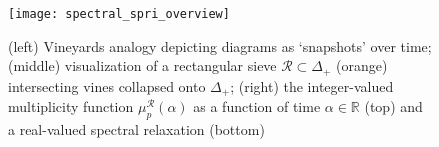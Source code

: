 \documentclass[10pt]{article}
\numberwithin{equation}{section}
\newcommand{\+}{%
	\raisebox{0.18ex}{\scaleobj{0.55}{+}}
}
\theoremstyle{definition}
\theoremstyle{definition}
\begin{document}
\noindent 


\begin{figure}\label{fig:overview}
\centering
\texttt{[image: spectral\_spri\_overview]}	
\caption{ (left) Vineyards analogy depicting diagrams as `snapshots' over time; (middle) visualization of a rectangular sieve $\mathcal{R} \subset \Delta_+$ (orange) intersecting vines collapsed onto $\Delta_+$; 
(right) the integer-valued multiplicity function $\mu_p^{\mathcal{R}}(\alpha)$ 
as a function of time $\alpha \in \mathbb{R}$ (top) and a real-valued spectral relaxation (bottom)
}
\end{figure}





\end{document}
